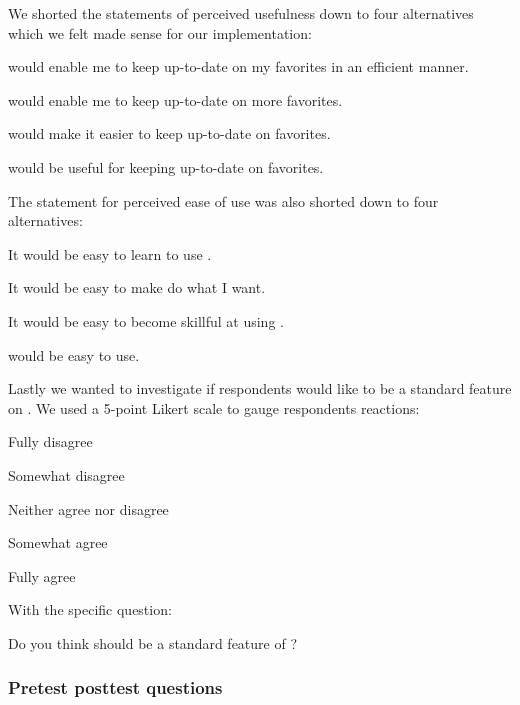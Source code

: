 We shorted the statements of perceived usefulness down to four alternatives
which we felt made sense for our implementation:

\begin{items}
  \item \latest{} would enable me to keep up-to-date on my favorites in an
    efficient manner.
  \item \latest{} would enable me to keep up-to-date on more favorites.
  \item \latest{} would make it easier to keep up-to-date on favorites.
  \item \latest{} would be useful for keeping up-to-date on favorites.
\end{items}

The statement for perceived ease of use was also shorted down to four
alternatives:

\begin{items}
  \item It would be easy to learn to use \latest{}.
  \item It would be easy to make \latest{} do what I want.
  \item It would be easy to become skillful at using \latest{}.
  \item \latest{} would be easy to use.
\end{items}

Lastly we wanted to investigate if respondents would like \latest{} to be a
standard feature on \urort{}.
We used a 5-point Likert scale \citep{likert32} to gauge respondents
reactions:

\begin{items}
  \item Fully disagree
  \item Somewhat disagree
  \item Neither agree nor disagree
  \item Somewhat agree
  \item Fully agree
\end{items}

With the specific question:

\begin{items}
  \item Do you think \latest{} should be a standard feature of \urort{}?
\end{items}

\subsubsection{Pretest \oldand posttest questions}

